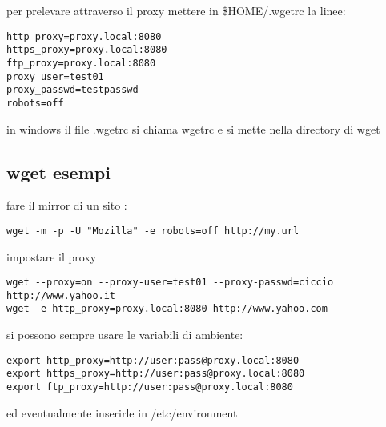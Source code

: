 \documentclass[]{article}
\begin{document}
per prelevare attraverso il proxy mettere in \$HOME/.wgetrc la linee:

\begin{verbatim}
http_proxy=proxy.local:8080
https_proxy=proxy.local:8080
ftp_proxy=proxy.local:8080
proxy_user=test01
proxy_passwd=testpasswd
robots=off          
\end{verbatim}

in windows il file .wgetrc si chiama wgetrc e si mette nella directory
di wget

\subsection{wget esempi}\label{wget-esempi}

fare il mirror di un sito :

\begin{verbatim}
wget -m -p -U "Mozilla" -e robots=off http://my.url
\end{verbatim}

impostare il proxy

\begin{verbatim}
wget --proxy=on --proxy-user=test01 --proxy-passwd=ciccio http://www.yahoo.it 
wget -e http_proxy=proxy.local:8080 http://www.yahoo.com
\end{verbatim}

si possono sempre usare le variabili di ambiente:

\begin{verbatim}
export http_proxy=http://user:pass@proxy.local:8080 
export https_proxy=http://user:pass@proxy.local:8080 
export ftp_proxy=http://user:pass@proxy.local:8080
\end{verbatim}

ed eventualmente inserirle in /etc/environment
\end{document}

